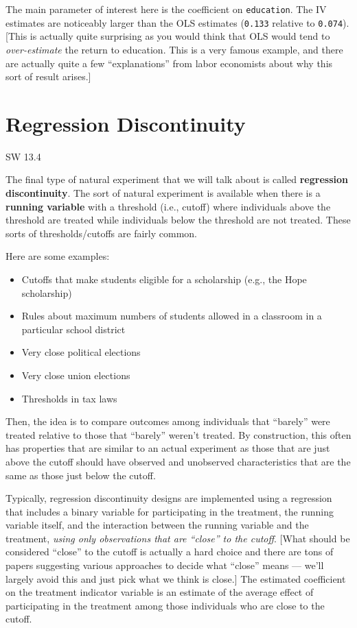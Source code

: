 \documentclass[
  letterpaper,
  DIV=11,
  numbers=noendperiod]{scrreprt}
\begin{document}
The main parameter of interest here is the coefficient on
\texttt{education}. The IV estimates are noticeably larger than the OLS
estimates (\texttt{0.133} relative to \texttt{0.074}). {[}This is
actually quite surprising as you would think that OLS would tend to
\emph{over-estimate} the return to education. This is a very famous
example, and there are actually quite a few ``explanations'' from labor
economists about why this sort of result arises.{]}

\section{Regression Discontinuity}\label{regression-discontinuity}

SW 13.4

The final type of natural experiment that we will talk about is called
\textbf{regression discontinuity}. The sort of natural experiment is
available when there is a \textbf{running variable} with a threshold
(i.e., cutoff) where individuals above the threshold are treated while
individuals below the threshold are not treated. These sorts of
thresholds/cutoffs are fairly common.

Here are some examples:

\begin{itemize}
\item
  Cutoffs that make students eligible for a scholarship (e.g., the Hope
  scholarship)
\item
  Rules about maximum numbers of students allowed in a classroom in a
  particular school district
\item
  Very close political elections
\item
  Very close union elections
\item
  Thresholds in tax laws
\end{itemize}

Then, the idea is to compare outcomes among individuals that ``barely''
were treated relative to those that ``barely'' weren't treated. By
construction, this often has properties that are similar to an actual
experiment as those that are just above the cutoff should have observed
and unobserved characteristics that are the same as those just below the
cutoff.

Typically, regression discontinuity designs are implemented using a
regression that includes a binary variable for participating in the
treatment, the running variable itself, and the interaction between the
running variable and the treatment, \emph{using only observations that
are ``close'' to the cutoff}. {[}What should be considered ``close'' to
the cutoff is actually a hard choice and there are tons of papers
suggesting various approaches to decide what ``close'' means --- we'll
largely avoid this and just pick what we think is close.{]} The
estimated coefficient on the treatment indicator variable is an estimate
of the average effect of participating in the treatment among those
individuals who are close to the cutoff.
\end{document}
